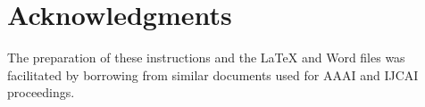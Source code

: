 \documentclass[letterpaper]{article}
\begin{document}
\section{Acknowledgments}

The preparation of these instructions and the \LaTeX{} and Word files was 
facilitated by borrowing from similar documents used for AAAI and IJCAI proceedings.









\end{document}
